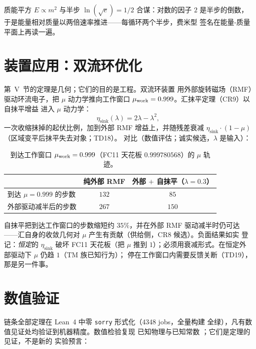 \documentclass[aps,prd,preprint,superscriptaddress,amsmath,amssymb]{revtex4-2}
\begin{document}
质能平方 $E\propto m^2$ 与半步 $\ln(\sqrt e)=1/2$ 合谋：对数的因子 $2$
是半步的倒数，于是能量相对质量以两倍速率推进——每循环两个半步，费米型
签名在能量-质量平面上再读一遍。

\section{装置应用：双流环优化}
\label{sec:device}

第~V~节的定理是几何；它们的目的是工程。双流环装置
\cite{DesignTwoFlowRing} 用外部旋转磁场（RMF）驱动环流电子，把 $\mu$
动力学推向工作窗口 $\mu_{\rm work}=0.999$。汇抹平定理（CR9）以自抹平增益
进入 $\mu$ 动力学：
\begin{equation}
\label{eq:etasink}
\eta_{\text{sink}}(\lambda)=2\lambda-\lambda^2 ,
\end{equation}
一次收缩抹掉的起伏比例，加到外部 RMF 增益上，并随残差衰减
$\eta_{\text{sink}}\cdot(1-\mu)$（区域变平后抹平失去对象；TD18）。
对比（数值评估；诚实候选，$\lambda$ 是输入）：

\begin{table}[h]
\caption{到达工作窗口 $\mu_{\rm work}=0.999$（FC11 天花板
$0.999780568$）的 $\mu$ 轨迹。}
\label{tab:sinkmu}
\begin{ruledtabular}
\begin{tabular}{lcc}
& 纯外部 RMF & 外部 $+$ 自抹平（$\lambda=0.3$） \\
\hline
到达 $\mu=0.999$ 的步数 & $132$ & $85$ \\
外部驱动减半后的步数 & $267$ & $150$ \\
\end{tabular}
\end{ruledtabular}
\end{table}

自抹平把到达工作窗口的步数缩短约 $35\%$，并在外部 RMF 驱动减半时仍可达
——汇自身的收敛几何对 $\mu$ 产生有贡献（供给侧，CR8 候选）。负面结果如实
登记：\emph{恒定}的 $\eta_{\text{sink}}$ 破坏 FC11 天花板（把 $\mu$ 推到
$1$）；必须用衰减形式。在恒定外部驱动下 $\mu$ 仍趋 $1$（TM 族已知行为）；
停在工作窗口内需要反馈关断（TD19），那是另一件事。

\section{数值验证}
\label{sec:numerics}

链条全部定理在 Lean~4 中零 \texttt{sorry} 形式化（4348 jobs，全量构建
全绿）\cite{de2015lean}，凡有数值见证处均验证到机器精度。数值检验复现
已知物理与已知常数 \cite{navas2024review}；它们是定理的见证，不是新的
实验预言：
\end{document}
